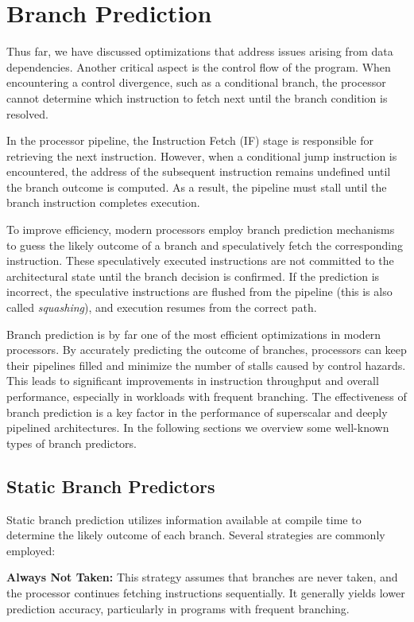 \section{Branch Prediction}

Thus far, we have discussed optimizations that address issues arising from data dependencies. Another critical aspect is the control flow of the program. When encountering a control divergence, such as a conditional branch, the processor cannot determine which instruction to fetch next until the branch condition is resolved.

In the processor pipeline, the Instruction Fetch (IF) stage is responsible for retrieving the next instruction. However, when a conditional jump instruction is encountered, the address of the subsequent instruction remains undefined until the branch outcome is computed. As a result, the pipeline must stall until the branch instruction completes execution.

To improve efficiency, modern processors employ branch prediction mechanisms to guess the likely outcome of a branch and speculatively fetch the corresponding instruction. These speculatively executed instructions are not committed to the architectural state until the branch decision is confirmed. If the prediction is incorrect, the speculative instructions are flushed from the pipeline (this is also called \textit{squashing}), and execution resumes from the correct path.

Branch prediction is by far one of the most efficient optimizations in modern processors. By accurately predicting the outcome of branches, processors can keep their pipelines filled and minimize the number of stalls caused by control hazards. This leads to significant improvements in instruction throughput and overall performance, especially in workloads with frequent branching. The effectiveness of branch prediction is a key factor in the performance of superscalar and deeply pipelined architectures. In the following sections we overview some well-known types of branch predictors.

\subsection{Static Branch Predictors}

Static branch prediction utilizes information available at compile time to determine the likely outcome of each branch. Several strategies are commonly employed:

\textbf{Always Not Taken:} This strategy assumes that branches are never taken, and the processor continues fetching instructions sequentially. It generally yields lower prediction accuracy, particularly in programs with frequent branching.

